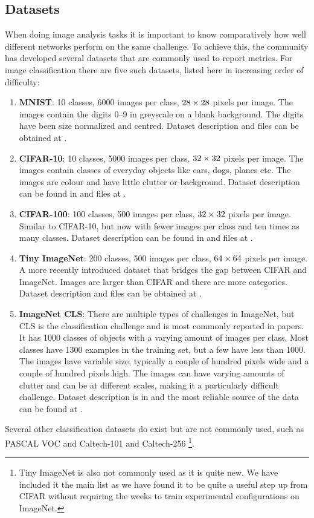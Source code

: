 \subsection{Datasets}
When doing image analysis tasks it is important to know comparatively how well
different networks perform on the same challenge. To achieve this, the
community has developed several datasets that are commonly used to report
metrics. For image classification there are five such datasets, listed here in
increasing order of difficulty:
\begin{enumerate}
  \item \textbf{MNIST}: 10 classes, 6000 images per class, $28\times 28$ pixels per image. 
    The images contain the digits 0--9 in greyscale on a blank background. The
    digits have been size normalized and centred. Dataset description and files can be obtained 
    at \cite{lecun_modified_1998}.
  \item \textbf{CIFAR-10}: 10 classes, 5000 images per class, $32\times 32$ pixels per image.
    The images contain classes of everyday objects like cars, dogs, planes etc.
    The images are colour and have little clutter or background. Dataset
    description can be found in \cite{krizhevsky_learning_2009} and files at
    \cite{krizhevsky_cifar_2009}.
  \item \textbf{CIFAR-100}: 100 classes, 500 images per class, $32\times 32$ pixels per image. 
    Similar to CIFAR-10, but now with fewer images per class and ten times as
    many classes. Dataset description can be found in
    \cite{krizhevsky_learning_2009} and files at \cite{krizhevsky_cifar_2009}.
  \item \textbf{Tiny ImageNet}: 200 classes, 500 images per class, 
    $64 \times 64$ pixels per image. A more recently introduced dataset that bridges
    the gap between CIFAR and ImageNet. Images are larger than CIFAR and there
    are more categories. Dataset description and files can be obtained at \cite{li_tiny_2017}.
  \item \textbf{ImageNet CLS}: There are multiple types of challenges in ImageNet, but CLS
    is the classification challenge and is most commonly reported in papers. 
    It has 1000 classes of objects with a varying amount of images per class.
    Most classes have 1300 examples in the training set, but a few have less
    than 1000. The images have variable size, typically a couple of hundred
    pixels wide and a couple of hundred pixels high. The images can have varying
    amounts of clutter and can be at different scales, making it a particularly
    difficult challenge. Dataset description is in
    \cite{russakovsky_imagenet_2014} and the most reliable source of the data
    can be found at \cite{stanford_vision_lab_imagenet_2017}.
\end{enumerate}
Several other classification datasets do exist but are not commonly used, such
as PASCAL VOC \cite{Everingham15} and Caltech-101 and Caltech-256
\cite{li_fei-fei_learning_2004}\footnote{Tiny ImageNet is also not commonly 
used as it is quite new. We have included it the main list as we have found it 
to be quite a useful step up from CIFAR without requiring the weeks to train
experimental configurations on ImageNet.}.

